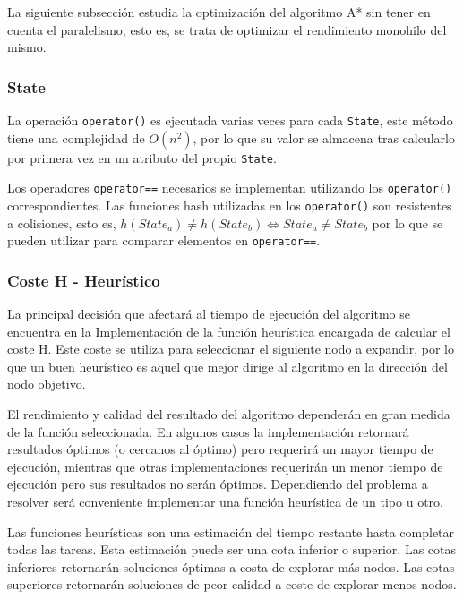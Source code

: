 La siguiente subsección estudia la optimización
del algoritmo A* sin tener en cuenta el paralelismo,
esto es, se trata de optimizar el rendimiento
monohilo del mismo.

\subsubsection{State}

La operación \lstinline{operator()} es ejecutada varias veces para cada
\lstinline{State}, este método tiene una complejidad de $O(n^2)$,
por lo que su valor se almacena tras calcularlo por primera vez
en un atributo del propio \lstinline{State}.

Los operadores \lstinline{operator==} necesarios se implementan utilizando
los \lstinline{operator()} correspondientes.
Las funciones hash utilizadas en los \lstinline{operator()}
son resistentes a colisiones,
esto es, $
h(State_a) \ne h(State_b) \iff State_a \ne State_b
$
por lo que se pueden
utilizar para comparar elementos en \lstinline{operator==}.

\pagebreak
\subsubsection{Coste H - Heurístico}
\label{ssec:Heuristicos}

La principal decisión que afectará al tiempo de ejecución
del algoritmo se encuentra en la Implementación
de la función heurística encargada de calcular el coste H.
Este coste se utiliza para seleccionar el siguiente nodo
a expandir, por lo que un buen heurístico es aquel que
mejor dirige al algoritmo en la dirección del nodo objetivo.

El rendimiento y calidad del resultado del algoritmo
dependerán en gran medida de la función seleccionada.
En algunos casos la implementación retornará resultados
óptimos (o cercanos al óptimo) pero requerirá un mayor tiempo
de ejecución, mientras que otras implementaciones
requerirán un menor tiempo de ejecución pero sus resultados
no serán óptimos.
Dependiendo del problema a resolver será conveniente implementar
una función heurística de un tipo u otro.

\begin{keynotebox}
    Las funciones heurísticas son una estimación del
    tiempo restante hasta completar todas las tareas.
    Esta estimación puede ser una cota inferior o superior.
    Las cotas inferiores retornarán soluciones óptimas a costa de explorar más nodos.
    Las cotas superiores retornarán soluciones de peor calidad a coste de explorar menos nodos.
\end{keynotebox}

